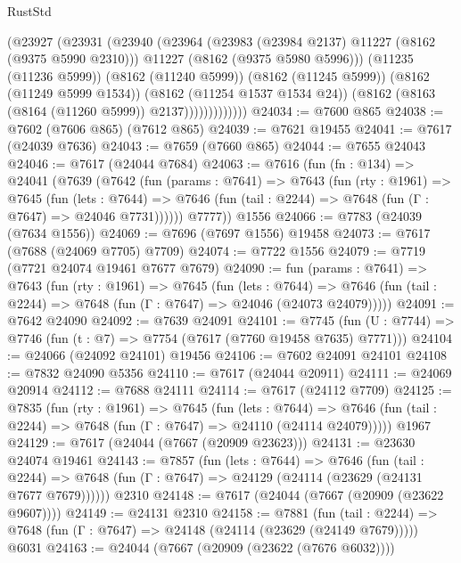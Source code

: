 \begin{lexlean}{RustStd}
\begin{coremodule}
                    (@23927
                      (@23931
                        (@23940
                          (@23964
                            (@23983 (@23984 @2137) @11227 (@8162 (@9375 @5990 @2310)))
                            @11227
                            (@8162 (@9375 @5980 @5996)))
                          (@11235 (@11236 @5999))
                          (@8162 (@11240 @5999))
                          (@8162 (@11245 @5999))
                          (@8162 (@11249 @5999 @1534))
                          (@8162 (@11254 @1537 @1534 @24))
                          (@8162 (@8163 (@8164 (@11260 @5999)) @2137)))))))))))))
@24034 := @7600 @865
@24038 := @7602 (@7606 @865) (@7612 @865)
@24039 := @7621 @19455
@24041 := @7617 (@24039 @7636)
@24043 := @7659 (@7660 @865)
@24044 := @7655 @24043
@24046 := @7617 (@24044 @7684)
@24063 := @7616
    (fun (fn : @134) =>
    @24041
      (@7639
        (@7642
          (fun (params : @7641) =>
          @7643
            (fun (rty : @1961) =>
            @7645
              (fun (lets : @7644) =>
              @7646 (fun (tail : @2244) => @7648 (fun (Γ : @7647) => @24046 @7731))))))
        @7777))
    @1556
@24066 := @7783 (@24039 (@7634 @1556))
@24069 := @7696 (@7697 @1556) @19458
@24073 := @7617 (@7688 (@24069 @7705) @7709)
@24074 := @7722 @1556
@24079 := @7719 (@7721 @24074 @19461 @7677 @7679)
@24090 := fun (params : @7641) =>
  @7643
    (fun (rty : @1961) =>
    @7645
      (fun (lets : @7644) =>
      @7646 (fun (tail : @2244) => @7648 (fun (Γ : @7647) => @24046 (@24073 @24079)))))
@24091 := @7642 @24090
@24092 := @7639 @24091
@24101 := @7745
    (fun (U : @7744) => @7746 (fun (t : @7) => @7754 (@7617 (@7760 @19458 @7635) @7771)))
@24104 := @24066 (@24092 @24101) @19456
@24106 := @7602 @24091 @24101
@24108 := @7832 @24090 @5356
@24110 := @7617 (@24044 @20911)
@24111 := @24069 @20914
@24112 := @7688 @24111
@24114 := @7617 (@24112 @7709)
@24125 := @7835
    (fun (rty : @1961) =>
    @7645
      (fun (lets : @7644) =>
      @7646 (fun (tail : @2244) => @7648 (fun (Γ : @7647) => @24110 (@24114 @24079)))))
    @1967
@24129 := @7617 (@24044 (@7667 (@20909 @23623)))
@24131 := @23630 @24074 @19461
@24143 := @7857
    (fun (lets : @7644) =>
    @7646
      (fun (tail : @2244) =>
      @7648 (fun (Γ : @7647) => @24129 (@24114 (@23629 (@24131 @7677 @7679))))))
    @2310
@24148 := @7617 (@24044 (@7667 (@20909 (@23622 @9607))))
@24149 := @24131 @2310
@24158 := @7881
    (fun (tail : @2244) => @7648 (fun (Γ : @7647) => @24148 (@24114 (@23629 (@24149 @7679)))))
    @6031
@24163 := @24044 (@7667 (@20909 (@23622 (@7676 @6032))))

\end{coremodule}
\end{lexlean}
